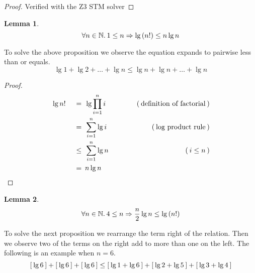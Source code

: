 \documentclass{article}
\newtheorem{lemma}{Lemma}
\theoremstyle{definition}
\newcommand{\evidence}[1]{\ensuremath{\hspace{3em} (\hspace{0.2em} \text{#1} \hspace{0.2em})}}
\newcommand{\relation}[1]{\ensuremath{\hspace{0.2em} {{} #1 {}} \hspace{0.2em}}}
\newcommand{\equal}{\relation{=}}
\newcommand{\lesseq}{\relation{\le}}
\newcommand{\parens}[1]{\left(#1\right)}
\newcommand{\brackets}[1]{\ensuremath{[ \hspace{0.2em} #1 \hspace{0.2em} ]}}
\newcommand{\quantify}[2]{\ensuremath{\forall #1 \in \mathbb{#2}. \hspace{0.2em}}}
\begin{document}
\begin{proof}
  Verified with the Z3 STM solver \qedhere
\end{proof}

\begin{lemma}
  \begin{equation*}
    \quantify{n}{N} 1 \le n \Rightarrow \lg{\parens{n!}} \le n \lg{n}
  \end{equation*} 
\end{lemma}
\noindent
To solve the above proposition we observe the equation expands to pairwise less than or equals.
\begin{equation*}
  \lg{1} + \lg{2} + \dots + \lg{n} \le \lg{n} + \lg{n} + \dots + \lg{n}
\end{equation*} 
\begin{proof}
      
  \begin{alignat*}{4}
    & \lg{n!} & \equal  & \lg{\prod_{i=1}^{n}{i}}  & \evidence{definition of factorial} \\
    & {}      & \equal  & \sum_{i=1}^{n}{\lg{i}}   & \evidence{log product rule} \\
    & {}      & \lesseq & \sum_{i=1}^{n}{\lg{n}}   & \evidence{$i \le n$} \\  
    & {}      & \equal  & n \lg{n}                & \qedhere
  \end{alignat*}
\end{proof}

\begin{lemma}
  \begin{equation*}
    \quantify{n}{N} 4 \le n \Rightarrow \frac{n}{2} \lg{n} \le \lg{\parens{n!}}
  \end{equation*} 
\end{lemma} 
\noindent
To solve the next proposition we rearrange the term right of the relation.
Then we observe two of the terms on the right add to more than one on the left.
The following is an example when $n = 6$.
\begin{equation*}
  \brackets{\lg{6}} + \brackets{\lg{6}} + \brackets{\lg{6}} \le
  \brackets{\lg{1} + \lg{6}} + \brackets{\lg{2} + \lg{5}} + \brackets{\lg{3} + \lg{4}}
\end{equation*}
\end{document}
